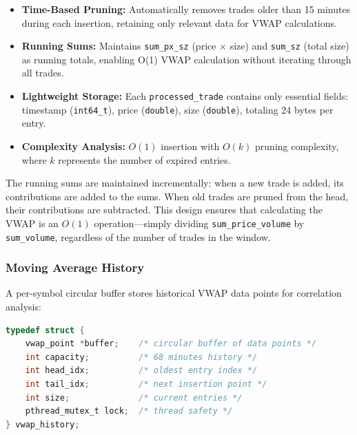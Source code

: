 \documentclass[12pt,a4paper]{article}
\begin{document}
\begin{itemize}

    \item \textbf{Time-Based Pruning:} Automatically removes trades older than 15 minutes during each insertion, retaining only relevant data for VWAP calculations.

    \item \textbf{Running Sums:} Maintains \texttt{sum\_px\_sz} (price × size) and \texttt{sum\_sz} (total size) as running totals, enabling O(1) VWAP calculation without iterating through all trades.

    \item \textbf{Lightweight Storage:} Each \texttt{processed\_trade} contains only essential fields: timestamp (\texttt{int64\_t}), price (\texttt{double}), size (\texttt{double}), totaling 24 bytes per entry.

    \item \textbf{Complexity Analysis:} $O(1)$ insertion with $O(k)$ pruning complexity, where $k$ represents the number of expired entries.
    
\end{itemize}

The running sums are maintained incrementally: when a new trade is added, its contributions are added to the sums. When old trades are pruned from the head, their contributions are subtracted. This design ensures that calculating the VWAP is an $O(1)$ operation—simply dividing \texttt{sum\_price\_volume} by \texttt{sum\_volume}, regardless of the number of trades in the window.



\subsubsection{Moving Average History}

A per-symbol circular buffer stores historical VWAP data points for correlation analysis:
 
\begin{lstlisting}[language=C, caption=Moving Average History Structure]
typedef struct {
    vwap_point *buffer;    /* circular buffer of data points */
    int capacity;          /* 68 minutes history */
    int head_idx;          /* oldest entry index */
    int tail_idx;          /* next insertion point */
    int size;              /* current entries */
    pthread_mutex_t lock;  /* thread safety */
} vwap_history;
\end{lstlisting}
\end{document}

